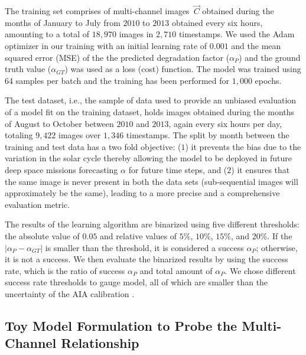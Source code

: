 \documentclass{aa}
\begin{document}
The training set comprises of multi-channel images~$\vec{C}$ obtained during the months of January to July from $2010$ to $2013$ obtained every six hours, amounting to a total of $18,970$ images in $2,710$ timestamps. We used the Adam optimizer \citep{Optimizer} in our training with an initial learning rate of $0.001$ and the mean squared error (MSE) of the the predicted degradation factor ($\alpha_P$) and the ground truth value ($\alpha_{GT}$) was used as a loss (cost) function. The model was trained using 64 samples per batch and the training has been performed for $1,000$ epochs.

The test dataset, i.e., the sample of data used to provide an unbiased evaluation of a model fit on the training dataset, holds images obtained during the months of August to October between $2010$ and $2013$, again every six hours per day, totaling $9,422$ images over $1,346$ timestamps. The split by month between the training and test data has a two fold objective: ($1$) it prevents the bias due to the variation in the solar cycle thereby allowing the model to be deployed in future deep space missions forecasting $\alpha$ for future time steps, and ($2$) it ensures that the same image is never present in both the data sets (sub-sequential images will approximately be the same), leading to a more precise and a comprehensive evaluation metric.

 The results of the learning algorithm are binarized using five different thresholds: the absolute value of $0.05$ and relative values of $5\%$, $10\%$, $15\%$, and $20\%$. If the $|\alpha_P - \alpha_{GT} |$ is smaller than the threshold, it is considered a success $\alpha_P$; otherwise, it is not a success. We then evaluate the binarized results by using the success rate, which is the ratio of success $\alpha_P$ and total amount of $\alpha_{P}$. We chose different success rate thresholds to gauge model, all of which are smaller than the uncertainty of the AIA calibration \citep[estimated as $28\%$ by ][]{AIA_calib_paper}.
 
 \subsection{Toy Model Formulation to Probe the Multi-Channel Relationship}

\label{section:inter_channel}

\end{document}
